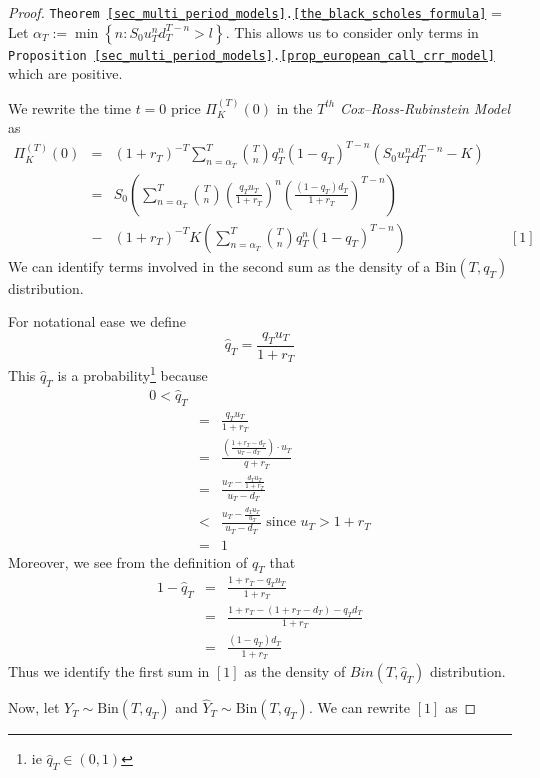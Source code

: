 \documentclass[11pt,a4paper]{article}
\begin{document}
  \begin{proof}{\texttt{Theorem  \ref{sec_multi_period_models}.\ref{the_black_scholes_formula}}}
    \everymath={\displaystyle}
    Let $\alpha_T:=\min\left\{n:S_0u_T^nd_T^{T-n}>l\right\}$. This allows us to consider only terms in \texttt{Proposition \ref{sec_multi_period_models}.\ref{prop_european_call_crr_model}} which are positive.
    \par We rewrite the time $t=0$ price $\Pi_K^{(T)}(0)$ in the $T^{th}$ \textit{Cox--Ross-Rubinstein Model} as
    \[\begin{array}{rcll}
      \Pi_K^{(T)}(0)&=&(1+r_T)^{-T}\sum_{n=\alpha_T}^T{T \choose n}q_T^n(1-q_T)^{T-n}(S_0u_T^nd_T^{T-n}-K)\\
      &=&S_0\left(\sum_{n=\alpha_T}^T{T\choose n}\left(\frac{q_Tu_T}{1+r_T}\right)^n\left(\frac{(1-q_T)d_T}{1+r_T}\right)^{T-n}\right)\\
      &-&(1+r_T)^{-T}K\left(\sum_{n=\alpha_T}^T{T\choose n}q_T^n(1-q_T)^{T-n}\right)&\quad[1]
    \end{array}\]
    We can identify terms involved in the second sum as the density of a $\text{Bin}(T,q_T)$ distribution.
    \par For notational ease we define
    \[ \hat{q}_T=\frac{q_Tu_T}{1+r_T} \]
    This $\hat{q}_T$ is a probability\footnote{ie $\hat{q}_T\in(0,1)$} because
    \[\begin{array}{rcl}
      0<\hat{q}_T\\
      &=&\frac{q_Tu_T}{1+r_T}\\
      &=&\frac{\left(\frac{1+r_T-d_T}{u_T-d_T}\right)\cdot u_T}{q+r_T}\\
      &=&\frac{u_T-\frac{d_Tu_T}{1+r_T}}{u_T-d_T}\\
      &<&\frac{u_T-\frac{d_Tu_T}{u_T}}{u_T-d_T}\text{ since }u_T>1+r_T\\
      &=&1
    \end{array}\]
    Moreover, we see from the definition of $q_T$ that
    \[\begin{array}{rcl}
      1-\hat{q}_T&=&\frac{1+r_T-q_Tu_T}{1+r_T}\\
      &=&\frac{1+r_T-(1+r_T-d_T)-q_Td_T}{1+r_T}\\
      &=&\frac{(1-q_T)d_T}{1+r_T}
    \end{array}\]
    Thus we identify the first sum in $[1]$ as the density of $Bin(T,\hat{q}_T)$ distribution.
    \par Now, let $Y_T\sim\text{Bin}(T,q_T)$ and $\hat{Y}_T\sim\text{Bin}(T,\hat{q}_T)$. We can rewrite $[1]$ as

\end{proof}
\end{document}

